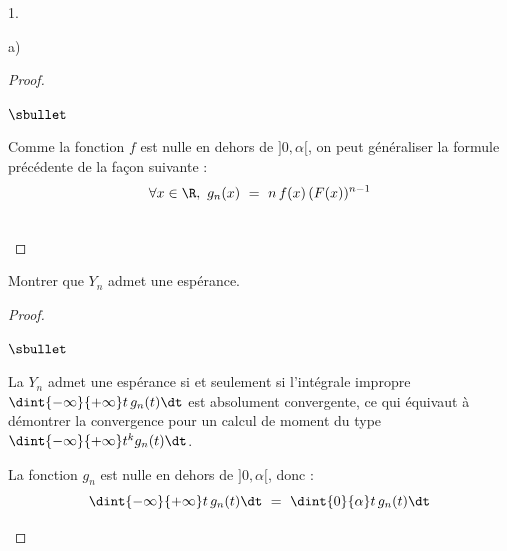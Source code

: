 \begin{noliste}{1.}
\begin{noliste}{a)}
\begin{proof}
\begin{noliste}{$\sbullet$}
	\conc{Une densité de $Y_n$ est donc $g_n : x \mapsto \left\{
	\begin{array}{cR{2cm}}
	  n \, f(x) \, (F(x))^{n-1} & si $x \in \ ]0,\alpha[$
	  \nl
	  0 & sinon
	\end{array}
	\right.$}
      \end{noliste}
      
      \begin{remark}
        Comme la fonction $f$ est nulle en dehors de $]0,\alpha[$,
        on peut généraliser la formule précédente de la façon 
        suivante :~\\[-.4cm]
        \[
          \forall x \in \R, \ g_n(x) \ = \ n \, f(x) \, (F(x))^{n-1}
        \]
      \end{remark}~\\[-1.4cm]
    \end{proof}

    
    \item Montrer que $Y_n$ admet une espérance.
    
    \begin{proof}~
      \begin{noliste}{$\sbullet$}
	\item La \var $Y_n$ admet une espérance si et seulement si 
	l'intégrale impropre $\dint{-\infty}{+\infty} t \, g_n(t) \dt$
	est absolument convergente, ce qui équivaut à démontrer la 
	convergence pour un calcul de moment du type $\dint{-\infty}
	{+\infty} t^k g_n(t) \dt$.
	
	\item La fonction $g_n$ est nulle en dehors de $]0,\alpha[$,
	donc :
	\[
	  \dint{-\infty}{+\infty} t \, g_n(t) \dt \ = \ 
	  \dint{0}{\alpha} t \, g_n(t) \dt
	\]
	
	
	\newpage
	

\end{noliste}
\end{proof}
\end{noliste}
\end{noliste}

